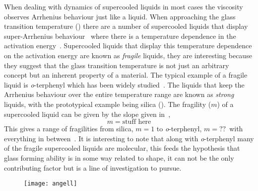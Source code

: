When dealing with dynamics of supercooled liquids in most cases the viscosity observes Arrhenius behaviour just like a liquid. When approaching the glass transition temperature (\si{\Tg}) there are a number of supercooled liquids that display super-Arrhenius behaviour~ where there is a temperature dependence in the activation energy~\cite{angell:91}. Supercooled liquids that display this temperature dependence on the activation energy are known as \emph{fragile} liquids, they are interesting because they suggest that the glass transition temperature is not just an arbitrary concept but an inherent property of a material. The typical example of a fragile liquid is \emph{o}-terphenyl which has been widely studied~\cite{greet:67}. The liquids that keep the Arrhenius behaviour over the entire temperature range are known as \emph{strong} liquids, with the prototypical example being silica (). The fragility ($m$) of a supercooled liquid can be given by the slope given in~,
\begin{equation}
    m = \text{stuff here}
\end{equation}
This gives a range of fragilities from silica, $m = 1$ to \emph{o}-terphenyl, $m = ??$~\tocheck with everything in between~\tabref{}. It is interesting to note that along with \emph{o}-terphenyl many of the fragile supercooled liquids are molecular, this feeds the hypothesis that glass forming ability is in some way related to shape, it can not be the only contributing factor but is a line of investigation to pursue.

\begin{figure}
    \texttt{[image: angell]}
    \label{fig:angell}
\end{figure}

